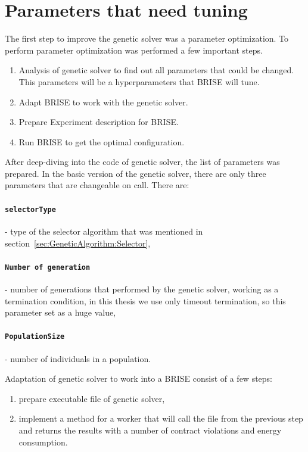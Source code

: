\section{Parameters that need tuning}
The first step to improve the genetic solver was a parameter optimization. To perform parameter optimization was performed a few important steps.
\begin{enumerate}
	\item Analysis of genetic solver to find out all parameters that could be changed. This parameters will be a hyperparameters that BRISE will tune.
	\item Adapt BRISE to work with the genetic solver.
	\item Prepare Experiment description for BRISE.
	\item Run BRISE to get the optimal configuration.
\end{enumerate}

After deep-diving into the code of genetic solver, the list of parameters was prepared.
In the basic version of the genetic solver, there are only three parameters that are changeable on call. There are:
	\paragraph{\texttt{selectorType}} - type of the selector algorithm that was mentioned in section~\ref{sec:GeneticAlgorithm:Selector},
	\paragraph{\texttt{Number of generation}} - number of generations that performed by the genetic solver, working as a termination condition, in this thesis we use only timeout termination, so this parameter set as a huge value,
	\paragraph{\texttt{PopulationSize}} - number of individuals in a population.

Adaptation of genetic solver to work into a BRISE consist of a few steps:
\begin{enumerate}
	\item prepare executable file of genetic solver,
	\item implement a method for a worker that will call the file from the previous step and returns the results with a number of contract violations and energy consumption.
\end{enumerate}

